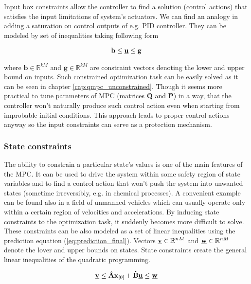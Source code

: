 Input box constraints allow the controller to find a solution (control actions) that satisfies the input limitations of system's actuators. We can find an analogy in adding a saturation on control outputs of e.g. PID controller. They can be modeled by set of inequalities taking following form

\begin{equation}
\begin{split}
\textbf{b} \leq \textbf{\underline{u}} \leq \textbf{g}
\end{split}
\label{eq:qmpc_input_constraints}
\end{equation}

where $\textbf{b} \in \mathbb{R}^{kM}$ and $\textbf{g} \in \mathbb{R}^{kM}$ are constraint vectors denoting the lower and upper bound on inputs. Such constrained optimization task can be easily solved as it can be seen in chapter \ref{cap:qmpc_unconstrained}. Though it seems more practical to tune parameters of MPC (matrices \textbf{\^Q} and \textbf{\^P}) in a way, that the controller won't naturally produce such control action even when starting from improbable initial conditions. This approach leads to proper control actions anyway so the input constraints can serve as a protection mechanism.

\subsubsection{State constraints}
 
The ability to constrain a particular state's values is one of the main features of the MPC. It can be used to drive the system within some safety region of state variables and to find a control action that won't push the system into unwanted states (sometime irreversibly, e.g. in chemical processes). A convenient example can be found also in a field of unmanned vehicles which can usually operate only within a certain region of velocities and accelerations. By inducing state constraints to the optimization task, it suddenly becomes more difficult to solve. These constraints can be also modeled as a set of linear inequalities using the prediction equation (\ref{eq:prediction_final}). Vectors $\textbf{\underline{v}} \in \mathbb{R}^{nM}$ and $\textbf{\underline{w}} \in \mathbb{R}^{nM}$ denote the lover and upper bounds on states. State constraints create the general linear inequalities of the quadratic programming.
 
\begin{equation}
\textbf{\underline{v}} \leq \textbf{\^A}\textbf{x}_{[0]} + \textbf{\^B}\textbf{\underline{u}} \leq \textbf{\underline{w}}
\label{eq:qmpc_state_constraints}
\end{equation}

